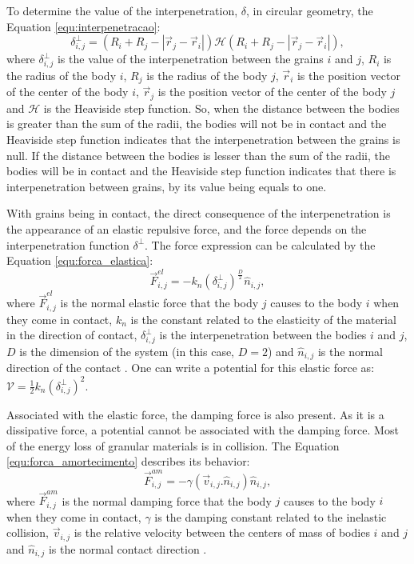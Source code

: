     To determine the value of the interpenetration, $\delta$, in circular geometry, the Equation \ref{equ:interpenetracao}:
\begin{equation}
    \label{equ:interpenetracao}
    \delta_{i,j}^{\perp} = \left(R_{i}+R_{j}-\left|\vec{r}_{j}-\vec{r}_{i}\right|\right)\mathcal{H}(R_{i}+R_{j}-\left|\vec{r}_{j}-\vec{r}_{i}\right|),
\end{equation}
where $\delta_{i,j}^{\perp}$ is the value of the interpenetration between the grains $i$ and $j$, $R_{i}$ is the radius of the body $i$, $R_{j}$ is the radius of the body $j$, $\vec{r}_{i}$ is the position vector of the center of the body $i$, $\vec{r}_{j}$ is the position vector of the center of the body $j$ and $\mathcal{H}$ is the Heaviside step function. So, when the distance between the bodies is greater than the sum of the radii, the bodies will not be in contact and the Heaviside step function indicates that the interpenetration between the grains is null. If the distance between the bodies is lesser than the sum of the radii, the bodies will be in contact and the Heaviside step function indicates that there is interpenetration between grains, by its value being equals to one.

    With grains being in contact, the direct consequence of the interpenetration is the appearance of an elastic repulsive force, and the force depends on the interpenetration function $\delta^{\perp}$. The force expression can be calculated by the Equation \ref{equ:forca_elastica}: 
\begin{equation}
    \label{equ:forca_elastica}
    \vec{F}_{i,j}^{el} = -k_{n}\left(\delta_{i,j}^{\perp}\right)^{\frac{D}{2}}\hat{n}_{i,j},
\end{equation}
where $\vec{F}_{i,j}^{el}$ is the normal elastic force that the body $j$ causes to the body $i$ when they come in contact, $k_{n}$ is the constant related to the elasticity of the material in the direction of contact, $\delta_{i,j}^{\perp}$ is the interpenetration between the bodies $i$ and $j$, $D$ is the dimension of the system (in this case, $D=2$) and $\hat{n}_{i,j}$ is the normal direction of the contact \cite{Dissertacao, Caio-Tese, Landau}. One can write a potential for this elastic force as: $\mathcal{V} = \frac{1}{2}k_{n}\left({\delta_{i,j}^{\perp}}\right)^2$.

    Associated with the elastic force, the damping force is also present. As it is a dissipative force, a potential cannot be associated with the damping force. Most of the energy loss of granular materials is in collision. The Equation \ref{equ:forca_amortecimento} describes its behavior: 
\begin{equation}
    \label{equ:forca_amortecimento}
    \vec{F}_{i,j}^{am} = -\gamma \left(\vec{v}_{i,j}.\hat{n}_{i,j}\right)\hat{n}_{i,j},
\end{equation}
where $\vec{F}_{i,j}^{am}$ is the normal damping force that the body $j$ causes to the body $i$ when they come in contact, $\gamma$ is the damping constant related to the inelastic collision, $\vec{v}_{i,j}$ is the relative velocity between the centers of mass of bodies $i$ and $j$ and $\hat{n}_{i,j}$ is the normal contact direction \cite{Dissertacao, Caio-Tese, Computational_Granular_Dynamics}.


